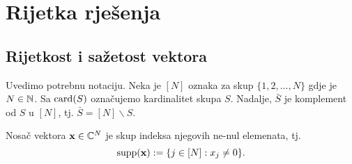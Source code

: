 \documentclass[a4paper,twoside,12pt]{memoir} %
\newcommand{\vect}[1]{\mathbf{#1}}
\renewcommand{\vec}{\vect}
\newcommand{\card}{\text{\normalfont{card}}}
\newcommand{\supp}{\text{\normalfont{supp}}}
\begin{document}
\chapter[Rijetka rje\v{s}enja][Rijetka rje\v{s}enja]{Rijetka rje\v{s}enja}\label{chapter_rijetka_rijesenja}	

\section[Rijetkost i sa\v{z}etost vektora][Rijetkost i sa\v{z}etost vektora]{Rijetkost i sa\v{z}etost vektora}
Uvedimo potrebnu notaciju. Neka je $[N]$ oznaka za skup $\{1,2,...,N\}$ gdje je $N\in\mathbb{N}$. Sa $\card(S)$ ozna\v{c}ujemo kardinalitet skupa $S$. Nadalje, $\bar{S}$ je komplement od $S$ u $[N]$, tj. $\bar{S}=[N]\backslash S$.

\begin{defn}
    Nosa\v{c} vektora $\vec{x} \in \C^{N}$ je skup indeksa njegovih ne-nul elemenata, tj.
    $$\supp(\vec{x}):=\{j\in[N]:x_j \neq 0 \}.$$
\end{defn}
\end{document}
